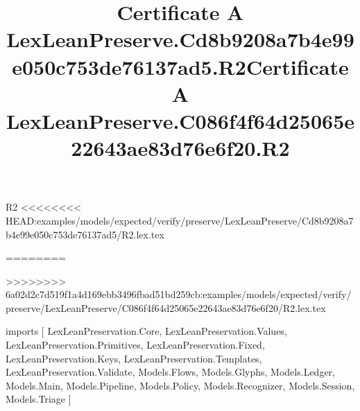 \begin{lexlean}{R2}
<<<<<<<< HEAD:examples/models/expected/verify/preserve/LexLeanPreserve/Cd8b9208a7b4e99e050c753de76137ad5/R2.lex.tex
\title{Certificate A LexLeanPreserve.Cd8b9208a7b4e99e050c753de76137ad5.R2}
========
\title{Certificate A LexLeanPreserve.C086f4f64d25065e22643ae83d76e6f20.R2}
>>>>>>>> 6a02d2c7d519f1a4d169ebb3496fbad51bd259cb:examples/models/expected/verify/preserve/LexLeanPreserve/C086f4f64d25065e22643ae83d76e6f20/R2.lex.tex
\begin{coremodule}
imports [
  LexLeanPreservation.Core,
  LexLeanPreservation.Values,
  LexLeanPreservation.Primitives,
  LexLeanPreservation.Fixed,
  LexLeanPreservation.Keys,
  LexLeanPreservation.Templates,
  LexLeanPreservation.Validate,
  Models.Flows,
  Models.Glyphs,
  Models.Ledger,
  Models.Main,
  Models.Pipeline,
  Models.Policy,
  Models.Recognizer,
  Models.Session,
  Models.Triage
]


\end{coremodule}
\end{lexlean}
